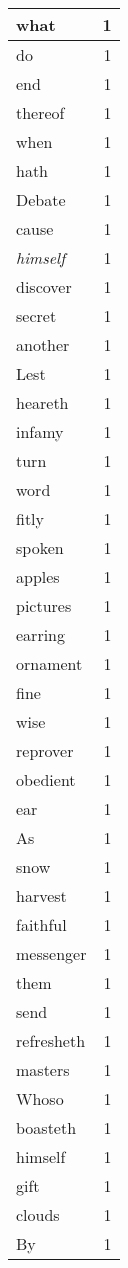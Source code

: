 \begin{center}
\begin{longtable}{l|r}
what & 1\\ \hline 
do & 1\\ \hline 
end & 1\\ \hline 
thereof & 1\\ \hline 
when & 1\\ \hline 
hath & 1\\ \hline 
Debate & 1\\ \hline 
cause & 1\\ \hline 
\emph{himself} & 1\\ \hline 
discover & 1\\ \hline 
secret & 1\\ \hline 
another & 1\\ \hline 
Lest & 1\\ \hline 
heareth & 1\\ \hline 
infamy & 1\\ \hline 
turn & 1\\ \hline 
word & 1\\ \hline 
fitly & 1\\ \hline 
spoken & 1\\ \hline 
apples & 1\\ \hline 
pictures & 1\\ \hline 
earring & 1\\ \hline 
ornament & 1\\ \hline 
fine & 1\\ \hline 
wise & 1\\ \hline 
reprover & 1\\ \hline 
obedient & 1\\ \hline 
ear & 1\\ \hline 
As & 1\\ \hline 
snow & 1\\ \hline 
harvest & 1\\ \hline 
faithful & 1\\ \hline 
messenger & 1\\ \hline 
them & 1\\ \hline 
send & 1\\ \hline 
refresheth & 1\\ \hline 
masters & 1\\ \hline 
Whoso & 1\\ \hline 
boasteth & 1\\ \hline 
himself & 1\\ \hline 
gift & 1\\ \hline 
clouds & 1\\ \hline 
By & 1\\ \hline 

\end{longtable}
\end{center}
